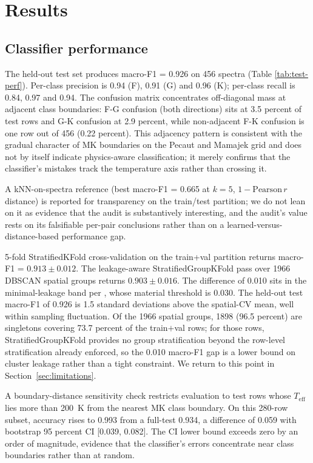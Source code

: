 \documentclass[11pt,a4paper]{article}
\newcommand{\Teff}{$T_{\mathrm{eff}}$\xspace}
\begin{document}
\section{Results}
\label{sec:results}

\subsection{Classifier performance}
\label{subsec:perf}

The held-out test set produces macro-F1 = 0.926 on 456 spectra (Table \ref{tab:test-perf}). Per-class precision is 0.94 (F), 0.91 (G) and 0.96 (K); per-class recall is 0.84, 0.97 and 0.94. The confusion matrix concentrates off-diagonal mass at adjacent class boundaries: F-G confusion (both directions) sits at 3.5 percent of test rows and G-K confusion at 2.9 percent, while non-adjacent F-K confusion is one row out of 456 (0.22 percent). This adjacency pattern is consistent with the gradual character of MK boundaries on the Pecaut and Mamajek grid and does not by itself indicate physics-aware classification; it merely confirms that the classifier's mistakes track the temperature axis rather than crossing it.

A kNN-on-spectra reference (best macro-F1 = 0.665 at $k = 5$, $1 - \mathrm{Pearson}\,r$ distance) is reported for transparency on the train/test partition; we do not lean on it as evidence that the audit is substantively interesting, and the audit's value rests on its falsifiable per-pair conclusions rather than on a learned-versus-distance-based performance gap.

5-fold StratifiedKFold cross-validation on the train+val partition returns macro-F1 = $0.913 \pm 0.012$. The leakage-aware StratifiedGroupKFold pass over 1966 DBSCAN spatial groups returns $0.903 \pm 0.016$. The difference of 0.010 sits in the minimal-leakage band per \citet{2019MNRAS.486.2075B}, whose material threshold is 0.030. The held-out test macro-F1 of 0.926 is 1.5 standard deviations above the spatial-CV mean, well within sampling fluctuation. Of the 1966 spatial groups, 1898 (96.5 percent) are singletons covering 73.7 percent of the train$+$val rows; for those rows, StratifiedGroupKFold provides no group stratification beyond the row-level stratification already enforced, so the 0.010 macro-F1 gap is a lower bound on cluster leakage rather than a tight constraint. We return to this point in Section~\ref{sec:limitations}.

A boundary-distance sensitivity check restricts evaluation to test rows whose \Teff lies more than 200~K from the nearest MK class boundary. On this 280-row subset, accuracy rises to 0.993 from a full-test 0.934, a difference of 0.059 with bootstrap 95 percent CI [0.039, 0.082]. The CI lower bound exceeds zero by an order of magnitude, evidence that the classifier's errors concentrate near class boundaries rather than at random.
\end{document}
